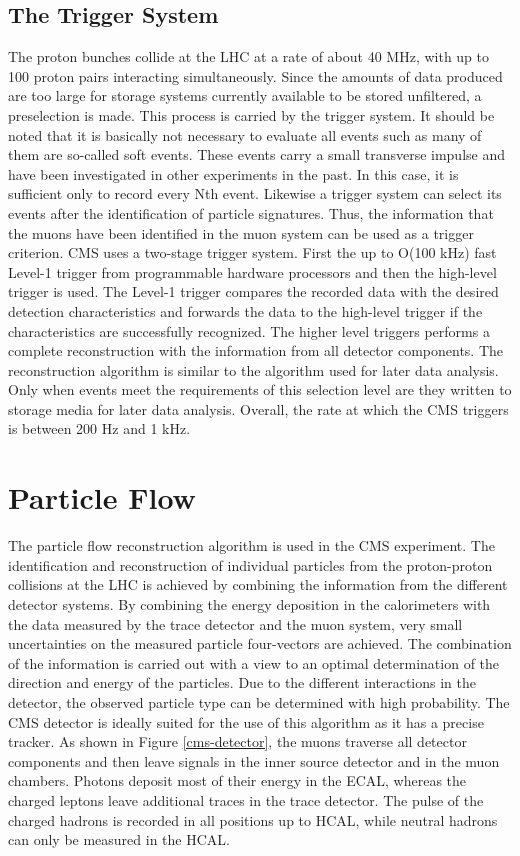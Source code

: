 \documentclass[12pt, a4paper]{thesis}
\begin{document}
\subsection{The Trigger System}
\label{sec:org9d9e9a7}
The proton bunches collide at the LHC at a rate of about 40 MHz, with
up to 100 proton pairs interacting simultaneously. Since the amounts
of data produced are too large for storage systems currently available
to be stored unfiltered, a preselection is made. This process is
carried by the trigger system. It should be noted that it is basically
not necessary to evaluate all events such as many of them are
so-called soft events. These events carry a small transverse impulse
and have been investigated in other experiments in the past. In this
case, it is sufficient only to record every Nth event. Likewise a
trigger system can select its events after the identification of
particle signatures. Thus, the information that the muons have been
identified in the muon system can be used as a trigger criterion. CMS
uses a two-stage trigger system. First the up to O(100 kHz) fast
Level-1 trigger from programmable hardware processors and then the
high-level trigger is used. The Level-1 trigger compares the recorded
data with the desired detection characteristics and forwards the data
to the high-level trigger if the characteristics are successfully
recognized. The higher level triggers performs a complete
reconstruction with the information from all detector components. The
reconstruction algorithm is similar to the algorithm used for later
data analysis. Only when events meet the requirements of this
selection level are they written to storage media for later data
analysis. Overall, the rate at which the CMS triggers is between 200
Hz and 1 kHz.

\section{Particle Flow}
\label{sec:org5293ff6}

The particle flow reconstruction algorithm is used in the CMS
experiment. The identification and reconstruction of individual
particles from the proton-proton collisions at the LHC is achieved by
combining the information from the different detector systems. By
combining the energy deposition in the calorimeters with the data
measured by the trace detector and the muon system, very small
uncertainties on the measured particle four-vectors are achieved. The
combination of the information is carried out with a view to an
optimal determination of the direction and energy of the
particles. Due to the different interactions in the detector, the
observed particle type can be determined with high probability.  The
CMS detector is ideally suited for the use of this algorithm as it has
a precise tracker. As shown in Figure \ref{cms-detector}, the muons
traverse all detector components and then leave signals in the inner
source detector and in the muon chambers. Photons deposit most of
their energy in the ECAL, whereas the charged leptons leave additional
traces in the trace detector. The pulse of the charged hadrons is
recorded in all positions up to HCAL, while neutral hadrons can only
be measured in the HCAL.
\end{document}
